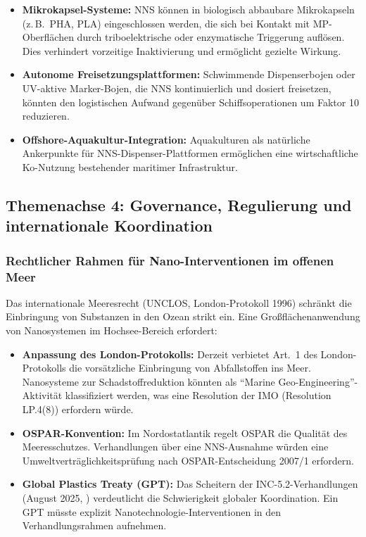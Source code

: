 ﻿\documentclass[12pt,a4paper]{article}
\theoremstyle{definition}
\theoremstyle{remark}
\begin{document}
\begin{itemize}
  \item \textbf{Mikrokapsel-Systeme:} NNS können in biologisch abbaubare
        Mikrokapseln (z.\,B.\ PHA, PLA) eingeschlossen werden, die sich bei
        Kontakt mit MP-Oberflächen durch triboelektrische oder enzymatische
        Triggerung auflösen. Dies verhindert vorzeitige Inaktivierung
        und ermöglicht gezielte Wirkung.
  \item \textbf{Autonome Freisetzungsplattformen:} Schwimmende Dispenserbojen
        oder UV-aktive Marker-Bojen, die NNS kontinuierlich und dosiert
        freisetzen, könnten den logistischen Aufwand gegenüber Schiffsoperationen
        um Faktor 10 reduzieren.
  \item \textbf{Offshore-Aquakultur-Integration:} Aquakulturen als
        natürliche Ankerpunkte für NNS-Dispenser-Plattformen ermöglichen
        eine wirtschaftliche Ko-Nutzung bestehender maritimer Infrastruktur.
\end{itemize}

\subsection{Themenachse 4: Governance, Regulierung und internationale Koordination}

\subsubsection{Rechtlicher Rahmen für Nano-Interventionen im offenen Meer}

Das internationale Meeresrecht (UNCLOS, London-Protokoll 1996) schränkt die
Einbringung von Substanzen in den Ozean strikt ein. Eine Großflächenanwendung
von Nanosystemen im Hochsee-Bereich erfordert:

\begin{itemize}
  \item \textbf{Anpassung des London-Protokolls:} Derzeit verbietet Art.\ 1
        des London-Protokolls die vorsätzliche Einbringung von
        Abfallstoffen ins Meer. Nanosysteme zur Schadstoffreduktion
        könnten als ``Marine Geo-Engineering''-Aktivität klassifiziert werden,
        was eine Resolution der IMO (Resolution LP.4(8)) erfordern würde.
  \item \textbf{OSPAR-Konvention:} Im Nordostatlantik regelt OSPAR die
        Qualität des Meeresschutzes. Verhandlungen über eine
        NNS-Ausnahme würden eine Umweltverträglichkeitsprüfung nach
        OSPAR-Entscheidung 2007/1 erfordern.
  \item \textbf{Global Plastics Treaty (GPT):} Das Scheitern der
        INC-5.2-Verhandlungen (August 2025, \cite{farrelly2025stalemates})
        verdeutlicht die Schwierigkeit globaler Koordination. Ein GPT
        müsste explizit Nanotechnologie-Interventionen in den Verhandlungsrahmen
        aufnehmen.
\end{itemize}
\end{document}
